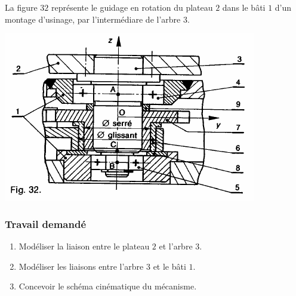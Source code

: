 

La figure $32$ représente le guidage en rotation du plateau $2$ dans le bâti $1$ d'un montage d'usinage, par l'intermédiare de l'arbre $3$.
\begin{center}
    \includegraphics[scale=0.8]{png/plateau.png}
\end{center}

\subsubsection{Travail demandé}
\begin{enumerate}
\item Modéliser la liaison entre le plateau $2$ et l'arbre $3$.
\item Modéliser les liaisons entre l'arbre $3$ et le bâti $1$.
\item Concevoir le schéma cinématique du mécanisme.
\end{enumerate}

